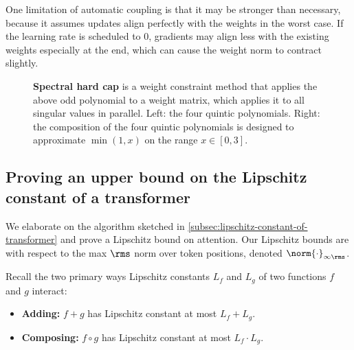 One limitation of automatic coupling is that it may be stronger than necessary, because it assumes updates align perfectly with the weights in the worst case. If the learning rate is scheduled to $0$, gradients may align less with the existing weights especially at the end, which can cause the weight norm to contract slightly.

\begin{figure}[t]
    \centering
    \subfloat{
        
    }
    \hspace{0.03\textwidth}
    \subfloat{
        
    }
    \caption{\textbf{Spectral hard cap} is a weight constraint method that applies the above odd polynomial to a weight matrix, which applies it to all singular values in parallel. Left: the four quintic polynomials. Right: the composition of the four quintic polynomials is designed to approximate $\min(1, x)$ on the range $x \in [0, 3]$.}
    \label{fig:spectral-hard-cap-graph}
\end{figure}



\subsection{Proving an upper bound on the Lipschitz constant of a transformer}
\label{app:lipschitz-attention}

We elaborate on the algorithm sketched in \cref{subsec:lipschitz-constant-of-transformer} and prove a Lipschitz bound on attention. Our Lipschitz bounds are with respect to the max $\rms$ norm over token positions, denoted $\norm{\cdot}_{\infty\rms}$.

Recall the two primary ways Lipschitz constants $L_f$ and $L_g$ of two functions $f$ and $g$ interact:
\begin{itemize}
    \item \textbf{Adding:} $f + g$ has Lipschitz constant at most $L_f + L_g$.
    \item \textbf{Composing:} $f \circ g$ has Lipschitz constant at most $L_f \cdot L_g$.
\end{itemize}

